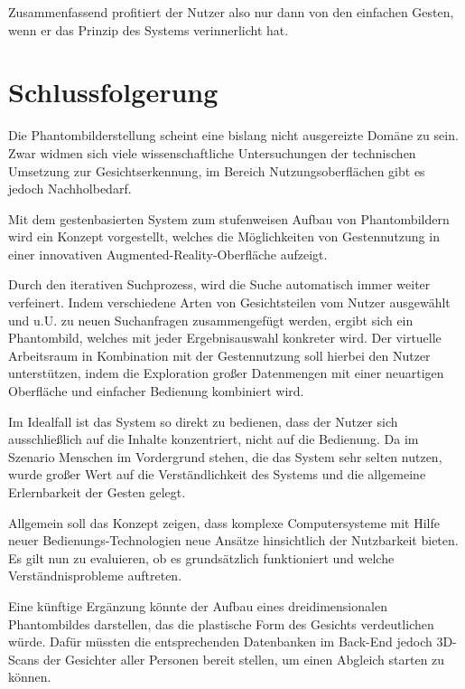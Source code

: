 \documentclass{sigchi-ext}
\begin{document}
Zusammenfassend profitiert der Nutzer also nur dann von den einfachen Gesten, wenn er das Prinzip des Systems verinnerlicht hat. 

\section{Schlussfolgerung}
Die Phantombilderstellung scheint eine bislang nicht ausgereizte
Domäne zu sein. Zwar widmen sich viele wissenschaftliche
Untersuchungen der technischen Umsetzung zur Gesichtserkennung, im
Bereich Nutzungsoberflächen gibt es jedoch Nachholbedarf. 

Mit dem gestenbasierten System zum stufenweisen Aufbau von
Phantombildern wird ein Konzept vorgestellt, welches die Möglichkeiten
von Gestennutzung in einer innovativen Augmented-Reality-Oberfläche
aufzeigt.

Durch den iterativen Suchprozess, wird die Suche automatisch immer weiter verfeinert.
Indem verschiedene Arten von Gesichtsteilen vom Nutzer ausgewählt und
u.U. zu neuen Suchanfragen zusammengefügt werden, ergibt sich ein
Phantombild, welches mit jeder Ergebnisauswahl konkreter wird. Der
virtuelle Arbeitsraum in Kombination mit der Gestennutzung soll
hierbei den Nutzer unterstützen, indem die Exploration großer
Datenmengen mit einer neuartigen Oberfläche und einfacher Bedienung
kombiniert wird. 

Im Idealfall ist das System so direkt zu bedienen, dass der Nutzer
sich ausschließlich auf die Inhalte konzentriert, nicht auf die
Bedienung.
Da im Szenario Menschen im Vordergrund stehen, die das System sehr
selten nutzen, wurde großer Wert auf die Verständlichkeit des Systems
und die allgemeine Erlernbarkeit der Gesten gelegt.
 
Allgemein soll das Konzept zeigen, dass komplexe Computersysteme mit Hilfe neuer Bedienungs-Technologien neue Ansätze hinsichtlich der Nutzbarkeit bieten.
Es gilt nun zu evaluieren, ob es grundsätzlich funktioniert und welche
Verständnisprobleme auftreten.

Eine künftige Ergänzung könnte der Aufbau eines dreidimensionalen Phantombildes 
darstellen, das die plastische Form des Gesichts verdeutlichen würde. Dafür müssten die entsprechenden Datenbanken im Back-End jedoch 3D-Scans der Gesichter aller Personen bereit stellen, um einen Abgleich starten zu können.

\balance{} 




\end{document}

